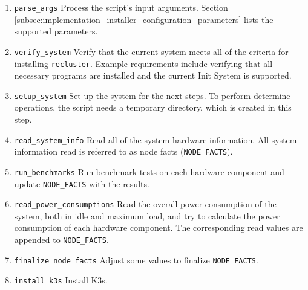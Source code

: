 \begin{enumerate}
  \item \texttt{parse\_args}
    \newline
    Process the script's input arguments.
    \newline
    Section \ref{subsec:implementation_installer_configuration_parameters} lists
    the supported parameters.

  \item \texttt{verify\_system}
    \newline
    Verify that the current system meets all of the criteria for installing
    \texttt{recluster}.
    \newline
    Example requirements include verifying that all necessary programs are
    installed and the current Init System is supported.

  \item \texttt{setup\_system}
    \newline
    Set up the system for the next steps.
    \newline
    To perform determine operations, the script needs a temporary directory, which
    is created in this step.

  \item \texttt{read\_system\_info}
    \newline
    Read all of the system hardware information.
    \newline
    All system information read is referred to as node facts (\texttt{NODE\_FACTS}).

  \item \texttt{run\_benchmarks}
    \newline
    Run benchmark tests on each hardware component and update \texttt{NODE\_FACTS}
    with the results.

  \item \texttt{read\_power\_consumptions}
    \newline
    Read the overall power consumption of the system, both in idle and maximum load,
    and try to calculate the power consumption of each hardware component.
    \newline
    The corresponding read values are appended to \texttt{NODE\_FACTS}.

  \item \texttt{finalize\_node\_facts}
    \newline
    Adjust some values to finalize \texttt{NODE\_FACTS}.

  \item \texttt{install\_k3s}
    \newline
    Install K3s.


\end{enumerate}
